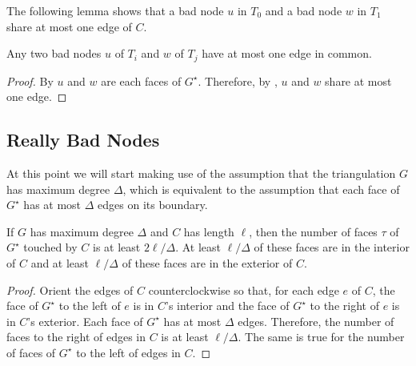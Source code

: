 \documentclass{patmorin}
\newcommand{\dual}[1]{{#1}^\star}
\begin{document}
The following lemma shows that a bad node $u$ in $T_0$ and a bad node $w$
in $T_1$ share at most one edge of $C$.

\begin{lem}
   Any two bad nodes $u$ of $T_i$ and $w$ of $T_j$ have at most one edge in common.
\end{lem}

\begin{proof}
    By  $u$ and $w$ are each faces of $\dual{G}$. Therefore, by , $u$ and $w$ share at most one edge.
\end{proof}

%
%

\subsection{Really Bad Nodes}


At this point we will start making use of the assumption that the
triangulation $G$ has maximum degree $\Delta$, which is equivalent to
the assumption that each face of $\dual{G}$ has at most $\Delta$ edges
on its boundary.

\begin{obs}
  If $G$ has maximum degree $\Delta$ and $C$ has length $\ell$, then
  the number of faces $\tau$ of $\dual{G}$ touched by $C$ is at least
  $2\ell/\Delta$.  At least $\ell/\Delta$ of these faces are in
  the interior of $C$ and at least $\ell/\Delta$ of these faces are
  in the exterior of $C$.
\end{obs}

\begin{proof}
  Orient the edges of $C$ counterclockwise so that, for each edge
  $e$ of $C$, the face of $\dual{G}$ to the left of $e$ is in $C$'s
  interior and the face of $\dual{G}$ to the right of $e$ is in $C$'s
  exterior.  Each face of $\dual{G}$ has at most $\Delta$ edges.
  Therefore, the number of faces to the right of edges in $C$ is
  at least $\ell/\Delta$. The same is true for the number of faces
  of $\dual{G}$ to the left of edges in $C$.
\end{proof}
\end{document}
